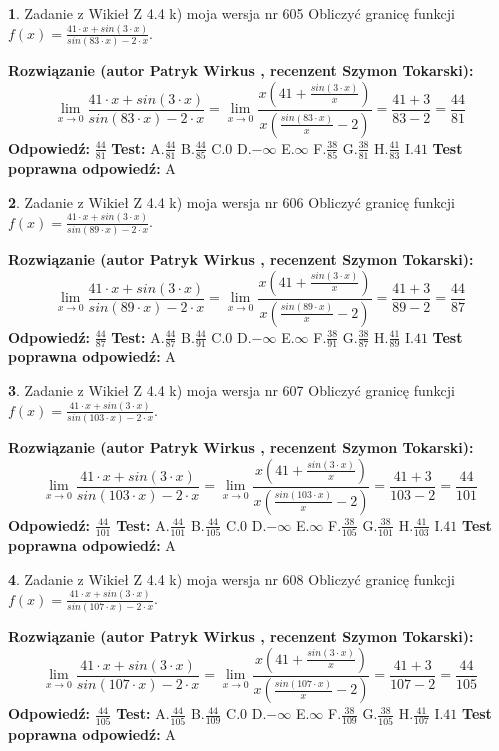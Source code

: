 \documentclass[12pt, a4paper]{article}
\theoremstyle{definition} %
\newtheorem{zad}{}
\newcommand{\zadStart}[1]{\begin{zad}#1\newline}
\newcommand{\zadStop}{\end{zad}}
\newcommand{\rozwStart}[2]{\noindent \textbf{Rozwiązanie (autor #1 , recenzent #2): }\newline}
\newcommand{\rozwStop}{\newline}
\newcommand{\odpStart}{\noindent \textbf{Odpowiedź:}\newline}
\newcommand{\odpStop}{\newline}
\newcommand{\testStart}{\noindent \textbf{Test:}\newline}
\newcommand{\testStop}{\newline}
\newcommand{\kluczStart}{\noindent \textbf{Test poprawna odpowiedź:}\newline}
\newcommand{\kluczStop}{\newline}
\begin{document}
\zadStart{Zadanie z Wikieł Z 4.4 k) moja wersja nr 605}
Obliczyć granicę funkcji $f(x)=\frac{41\cdot x +sin(3\cdot x)}{sin(83\cdot x) -2\cdot x}$.
\zadStop
\rozwStart{Patryk Wirkus}{Szymon Tokarski}
$$\lim\limits_{x\to 0}\frac{41\cdot x +sin(3\cdot x)}{sin(83\cdot x) -2\cdot x}
=\lim\limits_{x\to 0}\frac{x(41+\frac{sin(3\cdot x)}{x})}{x(\frac{sin(83\cdot x)}{x}-2)}
=\frac{41+3}{83-2} = \frac{44}{81}$$
\rozwStop
\odpStart
$\frac{44}{81}$
\odpStop
\testStart
A.$\frac{44}{81}$
B.$\frac{44}{85}$
C.$0$
D.$-\infty$
E.$\infty$
F.$\frac{38}{85}$
G.$\frac{38}{81}$
H.$\frac{41}{83}$
I.$41$
\testStop
\kluczStart
A
\kluczStop



\zadStart{Zadanie z Wikieł Z 4.4 k) moja wersja nr 606}
Obliczyć granicę funkcji $f(x)=\frac{41\cdot x +sin(3\cdot x)}{sin(89\cdot x) -2\cdot x}$.
\zadStop
\rozwStart{Patryk Wirkus}{Szymon Tokarski}
$$\lim\limits_{x\to 0}\frac{41\cdot x +sin(3\cdot x)}{sin(89\cdot x) -2\cdot x}
=\lim\limits_{x\to 0}\frac{x(41+\frac{sin(3\cdot x)}{x})}{x(\frac{sin(89\cdot x)}{x}-2)}
=\frac{41+3}{89-2} = \frac{44}{87}$$
\rozwStop
\odpStart
$\frac{44}{87}$
\odpStop
\testStart
A.$\frac{44}{87}$
B.$\frac{44}{91}$
C.$0$
D.$-\infty$
E.$\infty$
F.$\frac{38}{91}$
G.$\frac{38}{87}$
H.$\frac{41}{89}$
I.$41$
\testStop
\kluczStart
A
\kluczStop



\zadStart{Zadanie z Wikieł Z 4.4 k) moja wersja nr 607}
Obliczyć granicę funkcji $f(x)=\frac{41\cdot x +sin(3\cdot x)}{sin(103\cdot x) -2\cdot x}$.
\zadStop
\rozwStart{Patryk Wirkus}{Szymon Tokarski}
$$\lim\limits_{x\to 0}\frac{41\cdot x +sin(3\cdot x)}{sin(103\cdot x) -2\cdot x}
=\lim\limits_{x\to 0}\frac{x(41+\frac{sin(3\cdot x)}{x})}{x(\frac{sin(103\cdot x)}{x}-2)}
=\frac{41+3}{103-2} = \frac{44}{101}$$
\rozwStop
\odpStart
$\frac{44}{101}$
\odpStop
\testStart
A.$\frac{44}{101}$
B.$\frac{44}{105}$
C.$0$
D.$-\infty$
E.$\infty$
F.$\frac{38}{105}$
G.$\frac{38}{101}$
H.$\frac{41}{103}$
I.$41$
\testStop
\kluczStart
A
\kluczStop



\zadStart{Zadanie z Wikieł Z 4.4 k) moja wersja nr 608}
Obliczyć granicę funkcji $f(x)=\frac{41\cdot x +sin(3\cdot x)}{sin(107\cdot x) -2\cdot x}$.
\zadStop
\rozwStart{Patryk Wirkus}{Szymon Tokarski}
$$\lim\limits_{x\to 0}\frac{41\cdot x +sin(3\cdot x)}{sin(107\cdot x) -2\cdot x}
=\lim\limits_{x\to 0}\frac{x(41+\frac{sin(3\cdot x)}{x})}{x(\frac{sin(107\cdot x)}{x}-2)}
=\frac{41+3}{107-2} = \frac{44}{105}$$
\rozwStop
\odpStart
$\frac{44}{105}$
\odpStop
\testStart
A.$\frac{44}{105}$
B.$\frac{44}{109}$
C.$0$
D.$-\infty$
E.$\infty$
F.$\frac{38}{109}$
G.$\frac{38}{105}$
H.$\frac{41}{107}$
I.$41$
\testStop
\kluczStart
A
\kluczStop
\end{document}
